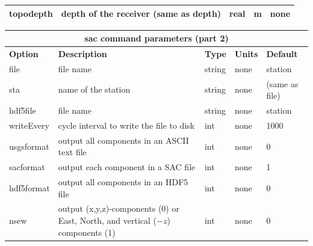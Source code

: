 \documentclass[11pt]{report}
\begin{document}
{\begin{center}
\begin{tabular}{|l|p{8cm}|l|l|l|}
		topodepth   & depth of the receiver (same as depth)             & real      & m          & none         \\ \hline
	\end{tabular}
\end{center}
\begin{center}
	\begin{tabular}{|l|p{8cm}|l|l|l|} \hline
		\multicolumn{5}{|c|}{\bf sac command parameters (part 2)}                                                                                                                           \\ \hline
		\bf{Option} & \bf{Description}                                                                                                            & \bf{Type} & \bf{Units} & \bf{Default}   \\ \hline \hline
		file        & file name                                                                                                                   & string    & none       & station        \\ \hline
		sta         & name of the station                                                                                                         & string    & none       & (same as file) \\ \hline
		hdf5file    & file name                                                                                                                   & string    & none       & station        \\ \hline
		writeEvery  & cycle interval to write the file to disk                                                                                    & int       & none       & 1000           \\ \hline
		usgsformat  & output all components in an ASCII text file                                                                                 & int       & none       & 0              \\ \hline
		sacformat   & output each component in a SAC file                                                                                         & int       & none       & 1              \\ \hline
		hdf5format  & output all components in an HDF5 file                                                                                       & int       & none       & 0              \\ \hline
		\hline
		nsew        & output (x,y,z)-components (0) or East, North, and vertical ($-z$) components (1)                                            & int       & none       & 0              \\ \hline

\end{tabular}
\end{center}}
\end{document}
